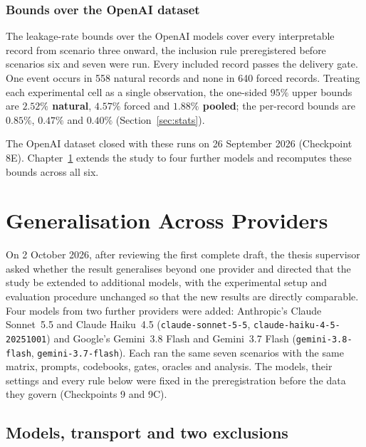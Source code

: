 \documentclass[12pt,oneside]{report}
\newcommand{\code}[1]{\texttt{\small #1}}
\begin{document}
\subsection{Bounds over the OpenAI dataset}
\label{sec:final-bounds}

The leakage-rate bounds over the OpenAI models cover every interpretable record
from scenario three onward, the inclusion rule preregistered before scenarios
six and seven were run. Every included record passes the delivery gate. One
event occurs in 558 natural records and none in 640 forced records. Treating
each experimental cell as a single observation, the one-sided $95\%$ upper
bounds are \textbf{$2.52\%$ natural}, $4.57\%$ forced and \textbf{$1.88\%$
pooled}; the per-record bounds are $0.85\%$, $0.47\%$ and $0.40\%$
(Section~\ref{sec:stats}).

The OpenAI dataset closed with these runs on 26 September 2026 (Checkpoint 8E).
Chapter~\ref{sec:cross-vendor} extends the study to four further models and
recomputes these bounds across all six.

\chapter{Generalisation Across Providers}
\label{sec:cross-vendor}


On 2 October 2026, after reviewing the first complete draft, the thesis
supervisor asked whether the result generalises beyond one provider and
directed that the study be extended to additional models, with the experimental
setup and evaluation procedure unchanged so that the new results are directly
comparable. Four models from two further providers were added: Anthropic's
Claude Sonnet~5.5 and Claude Haiku~4.5 (\code{claude-sonnet-5-5},
\code{claude-haiku-4-5-20251001}) and Google's Gemini~3.8 Flash and Gemini~3.7
Flash (\code{gemini-3.8-flash}, \code{gemini-3.7-flash}). Each ran the same seven
scenarios with the same matrix, prompts, codebooks, gates, oracles and analysis.
The models, their settings and every rule below were fixed in the
preregistration before the data they govern (Checkpoints 9 and 9C).

\section{Models, transport and two exclusions}
\end{document}
